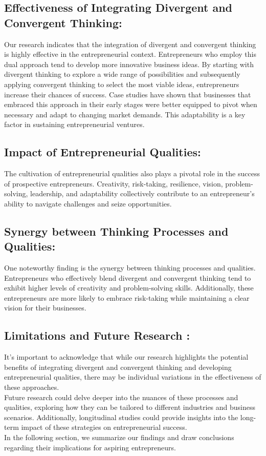 \documentclass[12pt]{report}
\begin{document}
\subsection*{Effectiveness of Integrating Divergent and Convergent Thinking:}
Our research indicates that the integration of divergent and convergent thinking is highly
effective in the entrepreneurial context. Entrepreneurs who employ this dual approach tend
to develop more innovative business ideas. By starting with divergent thinking to explore a
wide range of possibilities and subsequently applying convergent thinking to select the most
viable ideas, entrepreneurs increase their chances of success.
Case studies have shown that businesses that embraced this approach in their early stages
were better equipped to pivot when necessary and adapt to changing market demands. This
adaptability is a key factor in sustaining entrepreneurial ventures.
\subsection*{Impact of Entrepreneurial Qualities:}
The cultivation of entrepreneurial qualities also plays a pivotal role in the success of prospective entrepreneurs. Creativity, risk-taking, resilience, vision, problem-solving, leadership, and adaptability collectively contribute to an entrepreneur’s ability to navigate challenges and seize opportunities.
\subsection*{Synergy between Thinking Processes and Qualities:} One noteworthy finding is the synergy between thinking processes and qualities. Entrepreneurs who effectively blend divergent and convergent thinking tend to exhibit higher
levels of creativity and problem-solving skills. Additionally, these entrepreneurs are more
likely to embrace risk-taking while maintaining a clear vision for their businesses.
\subsection*{Limitations and Future Research
:} It’s important to acknowledge that while our research highlights the potential benefits of
integrating divergent and convergent thinking and developing entrepreneurial qualities, there
may be individual variations in the effectiveness of these approaches.\\
Future research could delve deeper into the nuances of these processes and qualities, exploring how they can be tailored to different industries and business scenarios. Additionally,
longitudinal studies could provide insights into the long-term impact of these strategies on
entrepreneurial success.\\
In the following section, we summarize our findings and draw conclusions regarding their
implications for aspiring entrepreneurs.
\end{document}
